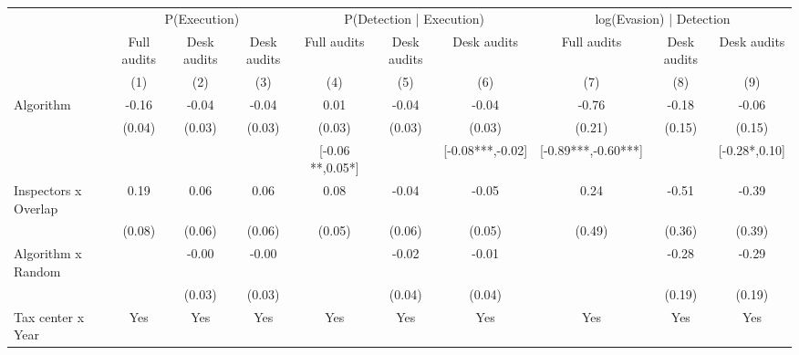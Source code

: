 \begin{tabular}{lccc|ccc|ccc} \toprule
\multicolumn{1}{l}{} & \multicolumn{3}{c}{P(Execution)} & \multicolumn{3}{c}{P(Detection | Execution)} & \multicolumn{3}{c}{log(Evasion) | Detection} \\\cmidrule(lr){2-4}\cmidrule(lr){5-7}\cmidrule(lr){8-10} \multicolumn{1}{l}{} & Full audits & Desk audits & Desk audits & Full audits & Desk audits & Desk audits & Full audits & Desk audits & Desk audits \\ \multicolumn{1}{l}{} & (1) & (2) & (3) & (4) & (5) & (6) & (7) & (8) & (9) \\ \midrule
Algorithm   &       -0.16\sym{***}&       -0.04         &       -0.04         &        0.01         &       -0.04         &       -0.04         &       -0.76\sym{***}&       -0.18         &       -0.06         \\
            &      (0.04)         &      (0.03)         &      (0.03)         &      (0.03)         &      (0.03)         &      (0.03)         &      (0.21)         &      (0.15)         &      (0.15)         \\
\addlinespace
 & & & & [-0.06 **,0.05*] & & [-0.08***,-0.02] & [-0.89***,-0.60***] & & [-0.28*,0.10] \\  Inspectors x Overlap&        0.19\sym{**} &        0.06         &        0.06         &        0.08         &       -0.04         &       -0.05         &        0.24         &       -0.51         &       -0.39         \\
            &      (0.08)         &      (0.06)         &      (0.06)         &      (0.05)         &      (0.06)         &      (0.05)         &      (0.49)         &      (0.36)         &      (0.39)         \\
\addlinespace
Algorithm x Random&                     &       -0.00         &       -0.00         &                     &       -0.02         &       -0.01         &                     &       -0.28         &       -0.29         \\
            &                     &      (0.03)         &      (0.03)         &                     &      (0.04)         &      (0.04)         &                     &      (0.19)         &      (0.19)         \\
\midrule
Tax center x Year&         Yes         &         Yes         &         Yes         &         Yes         &         Yes         &         Yes         &         Yes         &         Yes         &         Yes         \\

\end{tabular}
